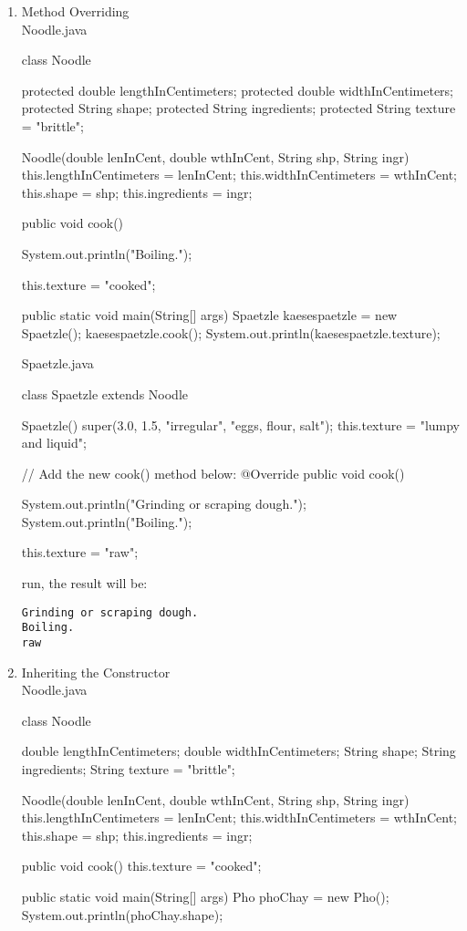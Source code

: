 \documentclass[a4paper,12pt]{article}
\begin{document}
\begin{enumerate}
\item Method Overriding\\
Noodle.java
\begin{javacode}
class Noodle {  
  protected double lengthInCentimeters;
  protected double widthInCentimeters;
  protected String shape;
  protected String ingredients;
  protected String texture = "brittle";
  
  Noodle(double lenInCent, double wthInCent, String shp, String ingr) {    
    this.lengthInCentimeters = lenInCent;
    this.widthInCentimeters = wthInCent;
    this.shape = shp;
    this.ingredients = ingr;    
  }
  
  public void cook() {
    System.out.println("Boiling.");
    
    this.texture = "cooked";
  }
  
  public static void main(String[] args) {    
    Spaetzle kaesespaetzle = new Spaetzle();
    kaesespaetzle.cook();
    System.out.println(kaesespaetzle.texture);    
  }  
}
\end{javacode}
Spaetzle.java
\begin{javacode}
class Spaetzle extends Noodle {  
  Spaetzle() {    
    super(3.0, 1.5, "irregular", "eggs, flour, salt");
    this.texture = "lumpy and liquid";    
  }
  
  // Add the new cook() method below:
  @Override
  public void cook() {
    System.out.println("Grinding or scraping dough.");
    System.out.println("Boiling.");
    
    this.texture = "raw";
  }  
}
\end{javacode}
run, the result will be:
\begin{verbatim}
Grinding or scraping dough.
Boiling.
raw
\end{verbatim}

\item Inheriting the Constructor\\
Noodle.java
\begin{javacode}
class Noodle {
  double lengthInCentimeters;
  double widthInCentimeters;
  String shape;
  String ingredients;
  String texture = "brittle";
  
  Noodle(double lenInCent, double wthInCent, String shp, String ingr) {
    this.lengthInCentimeters = lenInCent;
    this.widthInCentimeters = wthInCent;
    this.shape = shp;
    this.ingredients = ingr;
  }
  
  public void cook() {
    this.texture = "cooked";
  }
  
  public static void main(String[] args) {
    Pho phoChay = new Pho();
    System.out.println(phoChay.shape);
  }
}
\end{javacode}


\end{enumerate}
\end{document}
